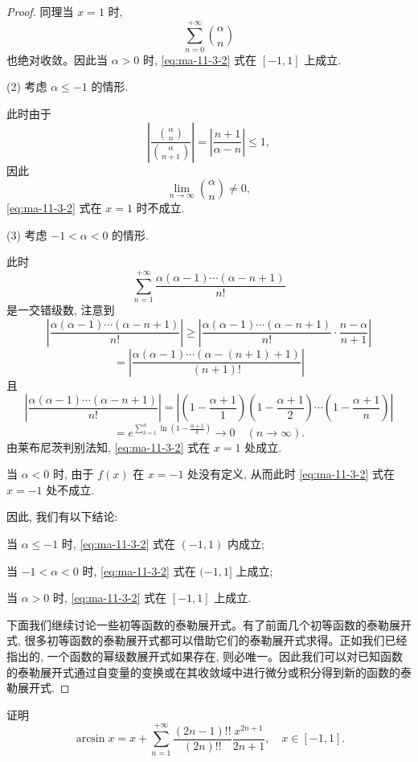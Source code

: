 \begin{proof}
同理当 $x=1$ 时,
\[
  \sum_{n=0}^{+\infty}\binom{\alpha}{n}
\]
也绝对收敛。因此当 $\alpha>0$ 时, \eqref{eq:ma-11-3-2} 式在 $[-1,1]$ 上成立.

(2) 考虑 $\alpha\leqslant-1$ 的情形.

此时由于
\[
  \left|
    \frac{\binom{\alpha}{n}}{\binom{\alpha}{n+1}}
  \right|
  =
  \left|\frac{n+1}{\alpha-n}\right|
  \leqslant1,
\]
因此
\[
  \lim_{n\to\infty}\binom{\alpha}{n}\ne0,
\]
\eqref{eq:ma-11-3-2} 式在 $x=1$ 时不成立.

(3) 考虑 $-1<\alpha<0$ 的情形.

此时
\[
  \sum_{n=1}^{+\infty}
  \frac{\alpha(\alpha-1)\cdots(\alpha-n+1)}{n!}
\]
是一交错级数, 注意到
\[
  \left|
    \frac{\alpha(\alpha-1)\cdots(\alpha-n+1)}{n!}
  \right|
  \geqslant
  \left|
    \frac{\alpha(\alpha-1)\cdots(\alpha-n+1)}{n!}
    \cdot\frac{n-\alpha}{n+1}
  \right|
\]
\[
  =
  \left|
    \frac{\alpha(\alpha-1)\cdots(\alpha-(n+1)+1)}{(n+1)!}
  \right|
\]
且
\[
  \left|
    \frac{\alpha(\alpha-1)\cdots(\alpha-n+1)}{n!}
  \right|
  =
  \left|
    \left(1-\frac{\alpha+1}{1}\right)
    \left(1-\frac{\alpha+1}{2}\right)
    \cdots
    \left(1-\frac{\alpha+1}{n}\right)
  \right|
\]
\[
  =
  e^{\sum_{k=1}^{n}\ln\left(1-\frac{\alpha+1}{k}\right)}
  \to0\quad(n\to\infty).
\]
由莱布尼茨判别法知, \eqref{eq:ma-11-3-2} 式在 $x=1$ 处成立.

当 $\alpha<0$ 时, 由于 $f(x)$ 在 $x=-1$ 处没有定义, 从而此时 \eqref{eq:ma-11-3-2} 式在 $x=-1$ 处不成立.

因此, 我们有以下结论:

当 $\alpha\leqslant-1$ 时, \eqref{eq:ma-11-3-2} 式在 $(-1,1)$ 内成立;

当 $-1<\alpha<0$ 时, \eqref{eq:ma-11-3-2} 式在 $(-1,1]$ 上成立;

当 $\alpha>0$ 时, \eqref{eq:ma-11-3-2} 式在 $[-1,1]$ 上成立.

下面我们继续讨论一些初等函数的泰勒展开式。有了前面几个初等函数的泰勒展开式, 很多初等函数的泰勒展开式都可以借助它们的泰勒展开式求得。正如我们已经指出的, 一个函数的幂级数展开式如果存在, 则必唯一。因此我们可以对已知函数的泰勒展开式通过自变量的变换或在其收敛域中进行微分或积分得到新的函数的泰勒展开式.
\end{proof}


\begin{example}\label{example:ma-11-3-5}
证明
\[
  \arcsin x
  =
  x+\sum_{n=1}^{+\infty}
  \frac{(2n-1)!!}{(2n)!!}\frac{x^{2n+1}}{2n+1},
  \quad x\in[-1,1].
\]
\end{example}



